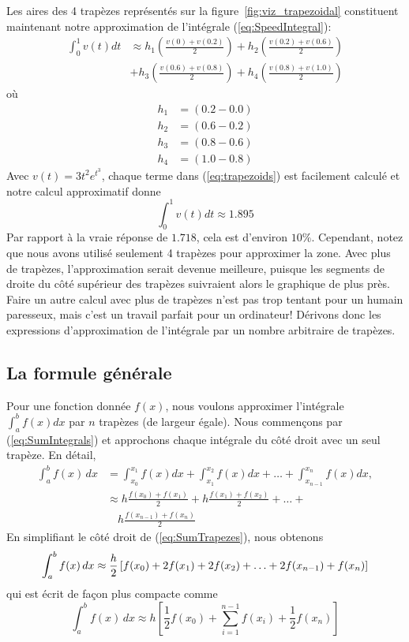 \documentclass[%
oneside,                 %
final,                   %
10pt]{article}
\begin{document}
Les aires des 4 trapèzes représentés sur la figure~\ref{fig:viz_trapezoidal} constituent maintenant notre approximation de l'intégrale (\ref{eq:SpeedIntegral}):
\begin{align}
\int_0^1 v(t)dt &\approx
h_1 (\frac{v(0)+v(0.2)}{2}) + h_2 (\frac{v(0.2)+v(0.6)}{2}) \nonumber  \\
&+ h_3 (\frac{v(0.6)+v(0.8)}{2}) + h_4 (\frac{v(0.8)+v(1.0)}{2})
\label{eq:trapezoids}
\end{align}
où
\begin{align}
h_1 &= (0.2 - 0.0) \label{eq:h1}\\
h_2 &= (0.6 - 0.2)  \label{eq:h2}\\
h_3 &= (0.8 - 0.6)  \label{eq:h3}\\
h_4 &= (1.0 - 0.8) \label{eq:h4}
\end{align}
Avec $v(t) = 3t^{2}e^{t^3}$, chaque terme dans (\ref{eq:trapezoids}) est facilement calculé et notre calcul approximatif donne
\begin{equation}
\int_0^1 v(t)dt \approx 1.895
\end{equation}
Par rapport à la vraie réponse de $1.718$, cela est d'environ $10 \%$. Cependant, notez que nous avons utilisé seulement 4 trapèzes pour approximer la zone. Avec plus de trapèzes, l'approximation serait devenue meilleure, puisque les segments de droite du côté supérieur des trapèzes suivraient alors le graphique de plus près. Faire un autre calcul avec plus de trapèzes n'est pas trop tentant pour un humain paresseux, mais c'est un travail parfait pour un ordinateur! Dérivons donc les expressions d'approximation de l'intégrale par un nombre arbitraire de trapèzes.
\subsection{La formule générale}
Pour une fonction donnée $f (x)$, nous voulons approximer l'intégrale $\int_a^bf(x)dx$ par $n$ trapèzes (de largeur égale). Nous commençons par (\ref{eq:SumIntegrals}) et approchons chaque intégrale du côté droit avec un seul trapèze. En détail,
\begin{align}
\int_a^b f(x)\,dx &= \int_{x_0}^{x_1} f(x) dx + \int_{x_1}^{x_2} f(x) dx + \ldots + \int_{x_{n-1}}^{x_n} f(x) dx,     \nonumber \\
                  &\approx h \frac{f(x_0) + f(x_1)}{2} +
		  h \frac{f(x_1) + f(x_2)}{2} + \ldots + \nonumber \\
		  &\quad h \frac{f(x_{n-1}) + f(x_n)}{2} \label{eq:SumTrapezes}
\end{align}
En simplifiant le côté droit de (\ref{eq:SumTrapezes}), nous obtenons
\begin{equation}
\int_a^b f(x)\,dx \approx \\
\frac{h}{2}\left[f(x_0) + 2 f(x_1) + 2 f(x_2) + \ldots + 2 f(x_{n-1}) + f(x_n)\right]
\end{equation}
qui est écrit de façon plus compacte comme
\begin{equation} \label{eq:GenralIntegral}
\int_a^b f(x)\,dx \approx h \left[\frac{1}{2}f(x_0) + \sum_{i=1}^{n-1}f(x_i) + \frac{1}{2}f(x_n) \right]
\end{equation}
\end{document}
